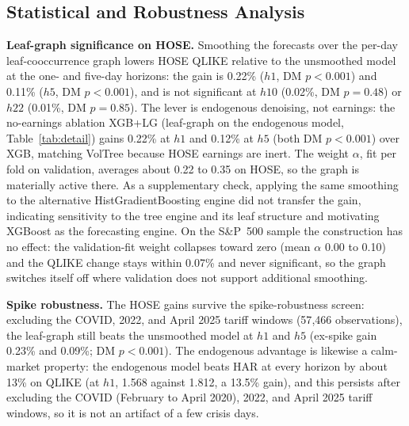 \documentclass[runningheads,a4paper]{llncs}
\begin{document}
\subsection{Statistical and Robustness Analysis}\label{sec:robust}
\textbf{Leaf-graph significance on HOSE.} Smoothing the forecasts over the per-day leaf-cooccurrence graph
lowers HOSE QLIKE relative to the unsmoothed model at the one- and five-day
horizons: the gain is 0.22\% ($h1$, DM $p<0.001$) and 0.11\% ($h5$, DM $p<0.001$), and is not
significant at $h10$ (0.02\%, DM $p=0.48$) or $h22$ (0.01\%, DM $p=0.85$).
The lever is endogenous denoising, not earnings: the no-earnings ablation XGB+LG (leaf-graph on the
endogenous model, Table~\ref{tab:detail}) gains 0.22\% at $h1$ and 0.12\% at $h5$ (both DM $p<0.001$) over
XGB, matching VolTree because HOSE earnings are inert.
The weight $\alpha$, fit per fold on validation, averages about 0.22 to 0.35 on HOSE, so the graph is
materially active there. As a supplementary check, applying the same smoothing to the alternative
HistGradientBoosting engine did not transfer the gain, indicating sensitivity to the tree engine and its
leaf structure and motivating XGBoost as the forecasting engine. On the S\&P~500 sample the construction
has no effect: the validation-fit weight collapses toward zero (mean $\alpha$ 0.00 to 0.10) and the QLIKE
change stays within 0.07\% and never significant, so the graph switches itself off where validation does
not support additional smoothing.

\textbf{Spike robustness.} The HOSE gains survive the spike-robustness screen: excluding the COVID, 2022,
and April 2025 tariff windows (57{,}466 observations), the leaf-graph still beats the unsmoothed model at
$h1$ and $h5$ (ex-spike gain 0.23\% and 0.09\%; DM $p<0.001$).
The endogenous advantage is likewise a calm-market property: the endogenous model beats HAR at every
horizon by about 13\% on QLIKE (at $h1$, 1.568 against 1.812, a 13.5\% gain), and this persists after
excluding the COVID (February to April 2020), 2022, and April 2025 tariff windows, so it is not an
artifact of a few crisis days.
\end{document}

